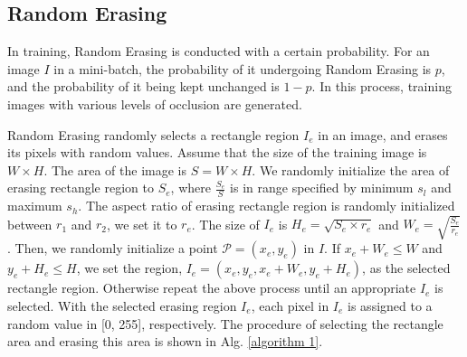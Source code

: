 \documentclass[10pt,twocolumn,letterpaper]{article}
\begin{document}
\subsection{Random Erasing}
In training, Random Erasing is conducted with a certain probability. For an image $I$ in a mini-batch, the probability of it undergoing Random Erasing is $p$, and the probability of it being kept unchanged is $1 - p$.
In this process, training images with various levels of occlusion are generated. 
    
    Random Erasing randomly selects a rectangle region $I_e$ in an image, and erases its pixels with random values. Assume that the size of the training image is $W \times H$. The area of the image is $S=W \times H$. We randomly initialize the area of erasing rectangle region to $S_e$, where $\frac{S_e}{S}$ is in range specified by minimum $s_l$ and maximum $s_h$. The aspect ratio of erasing rectangle region is randomly initialized between $r_1$ and $r_2$, we set it to $r_e$. The size of $I_e$ is $H_e = \sqrt{S_e \times r_e}$ and $W_e = \sqrt{\frac{S_e}{r_e}}$.
    Then, we randomly initialize a point $\mathcal{P} = (x_e, y_e)$ in $I$. If $x_e + W_e \le W$ and $y_e + H_e \le H$, we set the region, $I_e = (x_e, y_e, x_e+W_e, y_e+H_e)$, as the selected rectangle region. Otherwise repeat the above process until an appropriate $I_e$ is selected. With the selected erasing region $I_e$, each pixel in $I_e$ is assigned to a random value in [0, 255], respectively. The procedure of selecting the rectangle area and erasing this area is shown in Alg. \ref{algorithm 1}.
    

\end{document}
